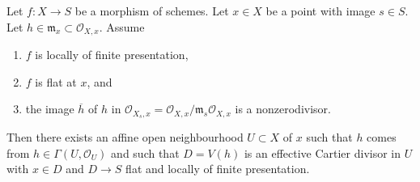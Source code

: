 \begin{lemma}
\label{lemma-slice-given-element}
Let $f : X \to S$ be a morphism of schemes.
Let $x \in X$ be a point with image $s \in S$.
Let $h \in \mathfrak m_x \subset \mathcal{O}_{X, x}$.
Assume
\begin{enumerate}
\item $f$ is locally of finite presentation,
\item $f$ is flat at $x$, and
\item the image $\overline{h}$ of $h$ in
$\mathcal{O}_{X_s, x} = \mathcal{O}_{X, x}/\mathfrak m_s\mathcal{O}_{X, x}$
is a nonzerodivisor.
\end{enumerate}
Then there exists an affine open neighbourhood $U \subset X$ of $x$
such that $h$ comes from $h \in \Gamma(U, \mathcal{O}_U)$ and such
that $D = V(h)$ is an effective Cartier divisor in $U$ with $x \in D$ and
$D \to S$ flat and locally of finite presentation.
\end{lemma}


